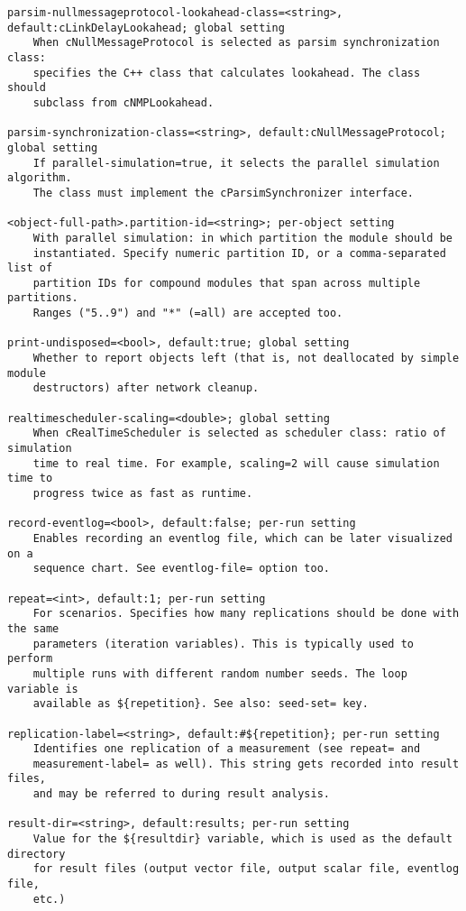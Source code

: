 \begin{verbatim}
parsim-nullmessageprotocol-lookahead-class=<string>, default:cLinkDelayLookahead; global setting
    When cNullMessageProtocol is selected as parsim synchronization class:
    specifies the C++ class that calculates lookahead. The class should
    subclass from cNMPLookahead.

parsim-synchronization-class=<string>, default:cNullMessageProtocol; global setting
    If parallel-simulation=true, it selects the parallel simulation algorithm.
    The class must implement the cParsimSynchronizer interface.

<object-full-path>.partition-id=<string>; per-object setting
    With parallel simulation: in which partition the module should be
    instantiated. Specify numeric partition ID, or a comma-separated list of
    partition IDs for compound modules that span across multiple partitions.
    Ranges ("5..9") and "*" (=all) are accepted too.

print-undisposed=<bool>, default:true; global setting
    Whether to report objects left (that is, not deallocated by simple module
    destructors) after network cleanup.

realtimescheduler-scaling=<double>; global setting
    When cRealTimeScheduler is selected as scheduler class: ratio of simulation
    time to real time. For example, scaling=2 will cause simulation time to
    progress twice as fast as runtime.

record-eventlog=<bool>, default:false; per-run setting
    Enables recording an eventlog file, which can be later visualized on a
    sequence chart. See eventlog-file= option too.

repeat=<int>, default:1; per-run setting
    For scenarios. Specifies how many replications should be done with the same
    parameters (iteration variables). This is typically used to perform
    multiple runs with different random number seeds. The loop variable is
    available as ${repetition}. See also: seed-set= key.

replication-label=<string>, default:#${repetition}; per-run setting
    Identifies one replication of a measurement (see repeat= and
    measurement-label= as well). This string gets recorded into result files,
    and may be referred to during result analysis.

result-dir=<string>, default:results; per-run setting
    Value for the ${resultdir} variable, which is used as the default directory
    for result files (output vector file, output scalar file, eventlog file,
    etc.)


\end{verbatim}
